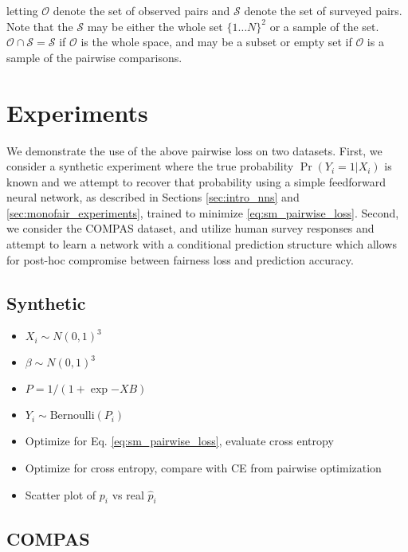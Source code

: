     letting $\mathcal{O}$ denote the set of observed pairs and $\mathcal{S}$ denote the set of surveyed pairs.  Note that the $\mathcal{S}$ may be either the whole set $\{1 \ldots N\}^2$ or a sample of the set.  $\mathcal{O} \cap \mathcal{S} = \mathcal{S}$ if $\mathcal{O}$ is the whole space, and may be a subset or empty set if $\mathcal{O}$ is a sample of the pairwise comparisons.

\section{Experiments}\label{sec:softmono_experiments}

    We demonstrate the use of the above pairwise loss on two datasets.  First, we consider a synthetic experiment where the true probability $\Pr(Y_i = 1 | X_i)$ is known and we attempt to recover that probability using a simple feedforward neural network, as described in Sections \ref{sec:intro_nns} and \ref{sec:monofair_experiments}, trained to minimize \ref{eq:sm_pairwise_loss}.  Second, we consider the COMPAS dataset, and utilize human survey responses and attempt to learn a network with a conditional prediction structure which allows for post-hoc compromise between fairness loss and prediction accuracy.
    
    \subsection{Synthetic}
        \begin{itemize}
            \item $X_i \sim N(0, 1)^3$
            \item $\beta \sim N(0, 1)^3$
            \item $P = 1 / (1 + \exp{-XB})$
            \item $Y_i \sim \mbox{Bernoulli}(P_i)$
            \item Optimize for Eq. \ref{eq:sm_pairwise_loss}, evaluate cross entropy
            \item Optimize for cross entropy, compare with CE from pairwise optimization
            \item Scatter plot of $p_i$ vs real $\hat{p}_i$
        \end{itemize}
    
    \subsection{COMPAS}
    
